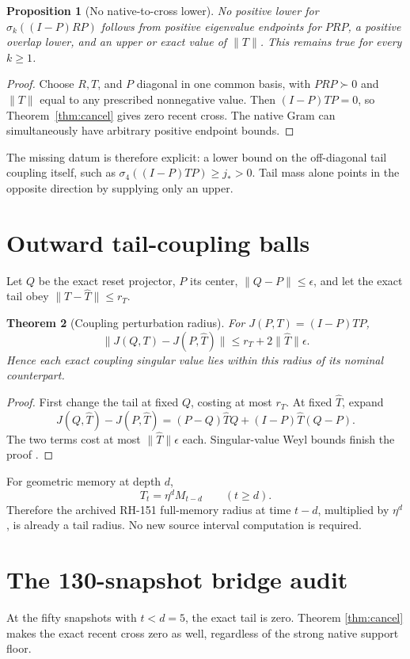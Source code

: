 \documentclass[12pt]{article}
\newtheorem{theorem}{Theorem}
\newtheorem{proposition}[theorem]{Proposition}
\begin{document}
\begin{proposition}[No native-to-cross lower]\label{prop:none}
No positive lower for $\sigma_k((I-P)RP)$ follows from positive eigenvalue
endpoints for $PRP$, a positive overlap lower, and an upper or exact value of
$\|T\|$.  This remains true for every $k\geq1$.
\end{proposition}
\begin{proof}
Choose $R,T$, and $P$ diagonal in one common basis, with $PRP\succ0$ and
$\|T\|$ equal to any prescribed nonnegative value.  Then
$(I-P)TP=0$, so Theorem~\ref{thm:cancel} gives zero recent cross.  The native
Gram can simultaneously have arbitrary positive endpoint bounds.
\end{proof}

The missing datum is therefore explicit: a lower bound on the off-diagonal
tail coupling itself, such as
$\sigma_4((I-P)TP)\geq j_*>0$.  Tail mass alone points in the opposite
direction by supplying only an upper.

\section{Outward tail-coupling balls}
Let $Q$ be the exact reset projector, $P$ its center,
$\|Q-P\|\leq\epsilon$, and let the exact tail obey
$\|T-\widehat T\|\leq r_T$.

\begin{theorem}[Coupling perturbation radius]\label{thm:radius}
For $J(P,T)=(I-P)TP$,
\[
 \|J(Q,T)-J(P,\widehat T)\|
 \leq r_T+2\|\widehat T\|\epsilon.
\]
Hence each exact coupling singular value lies within this radius of its
nominal counterpart.
\end{theorem}
\begin{proof}
First change the tail at fixed $Q$, costing at most $r_T$.  At fixed
$\widehat T$, expand
\[
 J(Q,\widehat T)-J(P,\widehat T)
 =(P-Q)\widehat TQ+(I-P)\widehat T(Q-P).
\]
The two terms cost at most $\|\widehat T\|\epsilon$ each.  Singular-value
Weyl bounds finish the proof \citep{Bhatia1997,StewartSun1990}.
\end{proof}

For geometric memory at depth $d$,
\[
 T_t=\eta^dM_{t-d}\qquad(t\geq d).
\]
Therefore the archived RH-151 full-memory radius at time $t-d$, multiplied
by $\eta^d$, is already a tail radius.  No new source interval computation is
required.

\section{The 130-snapshot bridge audit}
At the fifty snapshots with $t<d=5$, the exact tail is zero.  Theorem
\ref{thm:cancel} makes the exact recent cross zero as well, regardless of the
strong native support floor.
\end{document}
